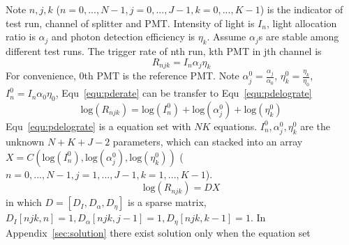 Note $n,j,k$ ($n=0,...,N-1, j=0,...,J-1, k=0,...,K-1$) is the indicator of test run, channel of splitter and PMT. Intensity of light is $I_n$, light allocation ratio is $\alpha_j$ and photon detection efficiency is $\eta_k$. Assume $\alpha_j$s are stable among different test runs. The trigger rate of nth run, kth PMT in jth channel is
\begin{equation}
    \label{equ:pderate}
    R_{njk}=I_n\alpha_j\eta_k
\end{equation}
For convenience, 0th PMT is the reference PMT. Note $\alpha_j^0=\frac{\alpha_j}{\alpha_0}$, $\eta_k^0=\frac{\eta_k}{\eta_0}$, $I_n^0=I_n\alpha_0\eta_0$, Equ~\eqref{equ:pderate} can be transfer to Equ~\eqref{equ:pdelograte}
\begin{equation}
    \label{equ:pdelograte}
    \mathrm{log}(R_{njk})=\mathrm{log}(I_n^0)+\mathrm{log}(\alpha_j^0)+\mathrm{log}(\eta_k^0)
\end{equation}
Equ~\eqref{equ:pdelograte} is a equation set with $NK$ equations. $I_n^0,\alpha_j^0,\eta_k^0$ are the unknown $N+K+J-2$ parameters, which can stacked into an array $X = C(\mathrm{log}(I_n^0), \mathrm{log}(\alpha_j^0),\mathrm{log}(\eta_k^0))$ ($n=0,...,N-1, j=1,...,J-1, k=1,...,K-1$). 
\begin{equation}
    \mathrm{log}(R_{njk})=DX
\end{equation}
in which $D=[D_I,D_\alpha, D_\eta]$ is a sparse matrix, $D_I[{njk},n]=1,D_\alpha[{njk},j-1]=1, D_\eta[{njk},k-1]=1$. 
In Appendix~\ref{sec:solution} there exist solution only when the  equation set
